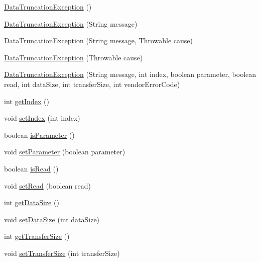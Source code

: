 \begin{DoxyCompactItemize}
\item 
\mbox{\hyperlink{classcom_1_1mysql_1_1cj_1_1exceptions_1_1_data_truncation_exception_a84adbd963dca73276819b28f9e115a8f}{Data\+Truncation\+Exception}} ()
\item 
\mbox{\hyperlink{classcom_1_1mysql_1_1cj_1_1exceptions_1_1_data_truncation_exception_a6b405fddb8928beee84d5583f10f41a8}{Data\+Truncation\+Exception}} (String message)
\item 
\mbox{\hyperlink{classcom_1_1mysql_1_1cj_1_1exceptions_1_1_data_truncation_exception_a27e4d8d6cc8598d6ffae52fe7fd68500}{Data\+Truncation\+Exception}} (String message, Throwable cause)
\item 
\mbox{\hyperlink{classcom_1_1mysql_1_1cj_1_1exceptions_1_1_data_truncation_exception_afac64ee427b63d5d82f3225687ea138f}{Data\+Truncation\+Exception}} (Throwable cause)
\item 
\mbox{\hyperlink{classcom_1_1mysql_1_1cj_1_1exceptions_1_1_data_truncation_exception_aa1cdb63d092ee11a858576e147ebb091}{Data\+Truncation\+Exception}} (String message, int index, boolean parameter, boolean read, int data\+Size, int transfer\+Size, int vendor\+Error\+Code)
\item 
int \mbox{\hyperlink{classcom_1_1mysql_1_1cj_1_1exceptions_1_1_data_truncation_exception_a5eea93972921be58d01471cad7a51cb7}{get\+Index}} ()
\item 
void \mbox{\hyperlink{classcom_1_1mysql_1_1cj_1_1exceptions_1_1_data_truncation_exception_a0fc2e6ebbc3e133e3591513a941a0c49}{set\+Index}} (int index)
\item 
boolean \mbox{\hyperlink{classcom_1_1mysql_1_1cj_1_1exceptions_1_1_data_truncation_exception_a4c860f4164592d42d33d856b6121137b}{is\+Parameter}} ()
\item 
void \mbox{\hyperlink{classcom_1_1mysql_1_1cj_1_1exceptions_1_1_data_truncation_exception_a2c8f259baba9eea56ce64d09d2b9c13c}{set\+Parameter}} (boolean parameter)
\item 
boolean \mbox{\hyperlink{classcom_1_1mysql_1_1cj_1_1exceptions_1_1_data_truncation_exception_a56701e2124f6f0da81681347b0a0795e}{is\+Read}} ()
\item 
void \mbox{\hyperlink{classcom_1_1mysql_1_1cj_1_1exceptions_1_1_data_truncation_exception_a32b89650fc31560898ee1df04fd37788}{set\+Read}} (boolean read)
\item 
int \mbox{\hyperlink{classcom_1_1mysql_1_1cj_1_1exceptions_1_1_data_truncation_exception_ab7ef3f657d9ddf371c7020059d851249}{get\+Data\+Size}} ()
\item 
void \mbox{\hyperlink{classcom_1_1mysql_1_1cj_1_1exceptions_1_1_data_truncation_exception_a99840fbd7ef6b933ec464f11f431119b}{set\+Data\+Size}} (int data\+Size)
\item 
int \mbox{\hyperlink{classcom_1_1mysql_1_1cj_1_1exceptions_1_1_data_truncation_exception_a0c86c824a310de04621cf6a350fcf919}{get\+Transfer\+Size}} ()
\item 
void \mbox{\hyperlink{classcom_1_1mysql_1_1cj_1_1exceptions_1_1_data_truncation_exception_aeef67895323c5098b53332afba588a07}{set\+Transfer\+Size}} (int transfer\+Size)
\end{DoxyCompactItemize}
